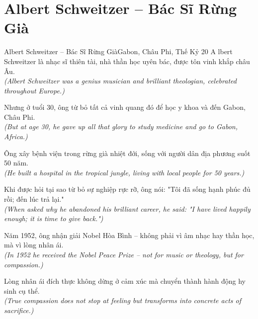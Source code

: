 \section{Albert Schweitzer -- Bác Sĩ Rừng Già}
\begin{truyen}{Albert Schweitzer -- Bác Sĩ Rừng Già}{Gabon, Châu Phi, Thế Kỷ 20}
A lbert Schweitzer là nhạc sĩ thiên tài, nhà thần học uyên bác, được tôn vinh khắp châu Âu.\\
\textit{(Albert Schweitzer was a genius musician and brilliant theologian, celebrated throughout Europe.)}

Nhưng ở tuổi 30, ông từ bỏ tất cả vinh quang đó để học y khoa và đến Gabon, Châu Phi.\\
\textit{(But at age 30, he gave up all that glory to study medicine and go to Gabon, Africa.)}

Ông xây bệnh viện trong rừng già nhiệt đới, sống với người dân địa phương suốt 50 năm.\\
\textit{(He built a hospital in the tropical jungle, living with local people for 50 years.)}

Khi được hỏi tại sao từ bỏ sự nghiệp rực rỡ, ông nói: "Tôi đã sống hạnh phúc đủ rồi; đến lúc trả lại."\\
\textit{(When asked why he abandoned his brilliant career, he said: "I have lived happily enough; it is time to give back.")}

Năm 1952, ông nhận giải Nobel Hòa Bình -- không phải vì âm nhạc hay thần học, mà vì lòng nhân ái.\\
\textit{(In 1952 he received the Nobel Peace Prize -- not for music or theology, but for compassion.)}

\end{truyen}
\begin{baihoc}
  Lòng nhân ái đích thực không dừng ở cảm xúc mà chuyển thành hành động hy sinh cụ thể.\\
  \textit{(True compassion does not stop at feeling but transforms into concrete acts of sacrifice.)}
\end{baihoc}

